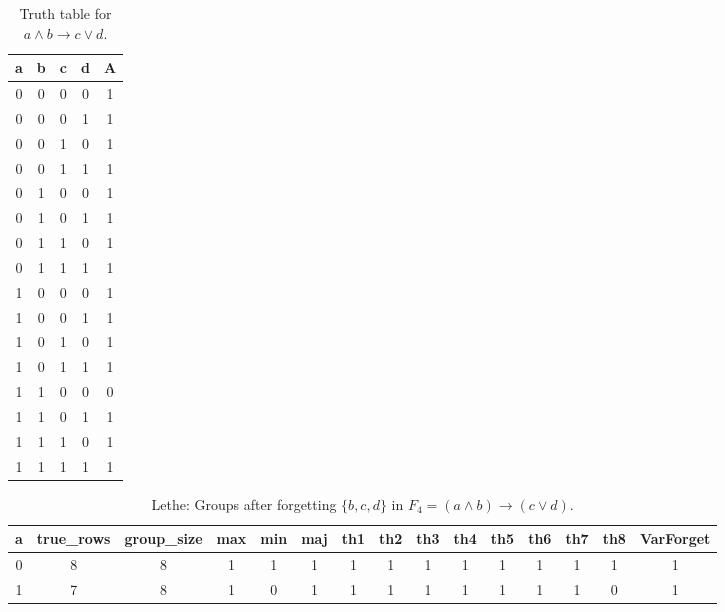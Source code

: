 \begin{table}[!tb]
    \centering
    \begin{tabular}{|c|c|c|c|c|}
        \hline
        \textbf{a} & \textbf{b} & \textbf{c} & \textbf{d} & \textbf{A} \\ \hline
        0 & 0 & 0 & 0 & 1 \\ \hline
        0 & 0 & 0 & 1 & 1 \\ \hline
        0 & 0 & 1 & 0 & 1 \\ \hline
        0 & 0 & 1 & 1 & 1 \\ \hline
        0 & 1 & 0 & 0 & 1 \\ \hline
        0 & 1 & 0 & 1 & 1 \\ \hline
        0 & 1 & 1 & 0 & 1 \\ \hline
        0 & 1 & 1 & 1 & 1 \\ \hline
        1 & 0 & 0 & 0 & 1 \\ \hline
        1 & 0 & 0 & 1 & 1 \\ \hline
        1 & 0 & 1 & 0 & 1 \\ \hline
        1 & 0 & 1 & 1 & 1 \\ \hline
        1 & 1 & 0 & 0 & 0 \\ \hline
        1 & 1 & 0 & 1 & 1 \\ \hline
        1 & 1 & 1 & 0 & 1 \\ \hline
        1 & 1 & 1 & 1 & 1 \\ \hline
    \end{tabular}
    \caption{Truth table for $a \land b \rightarrow c \lor d$.}
    \label{tab:truthtab}
\end{table}

\begin{table}[!tb]
    \centering
    \begin{tabular}{|c|c|c|c|c|c|c|c|c|c|c|c|c|c|c|}
        \hline
        \textbf{a} & \textbf{true\_rows} & \textbf{group\_size} & \textbf{max} & \textbf{min} & \textbf{maj} & \textbf{th1} & \textbf{th2} & \textbf{th3} & \textbf{th4} & \textbf{th5} & \textbf{th6} & \textbf{th7} & \textbf{th8} & \textbf{VarForget} \\ \hline
        \rowcolor{gray!40} 0 & 8 & 8 & 1 & 1 & 1 & 1 & 1 & 1 & 1 & 1 & 1 & 1 & 1 & 1 \\ \hline
        \rowcolor{blue!40} 1 & 7 & 8 & 1 & 0 & 1 & 1 & 1 & 1 & 1 & 1 & 1 & 1 & 0 & 1 \\ \hline
    \end{tabular}
    \caption{Lethe: Groups after forgetting $\{b, c, d\}$ in $F_{4} = (a \land b) \rightarrow (c \lor d)$.}
    \label{tab:lethe-F4-bcd-groups}
\end{table}
